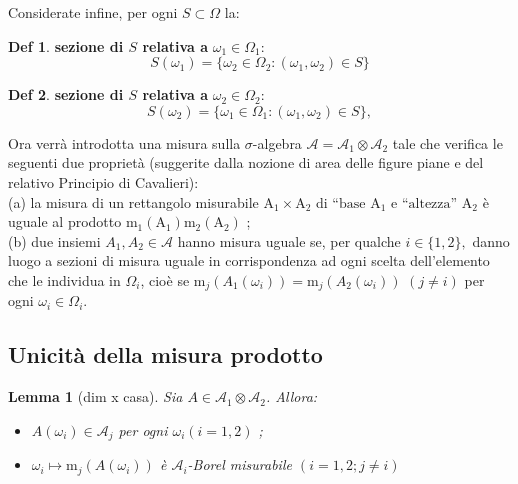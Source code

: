 \documentclass[a4paper,11pt]{article}
\theoremstyle{plain}
\newtheorem{lem}[thm]{Lemma}
\theoremstyle{definition}
\newtheorem{defn}{Def}[section]
\theoremstyle{remark}
\begin{document}
\noindent
Considerate infine, per ogni $S \subset \Omega$ la:

\begin{defn}
\textbf{sezione di $S$ relativa a} $\omega_{1}\in\Omega_{1}$:
$$
S(\omega_{1})=\{\omega_{2}\in\Omega_{2}:(\omega_{1}, \omega_{2})\in S\}
$$
\end{defn}
 
 \begin{defn}
\textbf{sezione di $S$ relativa a} $\omega_{2}\in\Omega_{2}$:
$$
S(\omega_{2})=\{\omega_{1}\in\Omega_{1}:(\omega_{1}, \omega_{2})\in S\},
$$
\end{defn}
 
 
 Ora verrà introdotta una misura sulla $\sigma$-algebra $\mathcal{A}=\mathcal{A}_{1}\otimes \mathcal{A}_{2}$ tale che verifica le seguenti due proprietà (suggerite dalla nozione di area delle figure piane $\mathrm{e}$ del relativo Principio di Cavalieri):\\
 
\noindent
(a) la misura di un rettangolo misurabile $\mathrm{A}_{1}\times \mathrm{A}_{2}$ di “$\mathrm{b}\mathrm{a}\mathrm{s}\mathrm{e}$ $\mathrm{A}_{1}$ e $ “\mathrm{a}\mathrm{l}\mathrm{t}\mathrm{e}\mathrm{z}\mathrm{z}\mathrm{a}$'' $\mathrm{A}_{2}$ è uguale al prodotto $\mathrm{m}_{1}(\mathrm{A}_{1})\mathrm{m}_{2}(\mathrm{A}_{2})$ ;\\

\noindent
(b) due insiemi $A_{1}, A_{2}\in \mathcal{A}$ hanno misura uguale se, per qualche $i\in\{1,2\},$ danno luogo a sezioni di misura uguale in corrispondenza ad ogni scelta dell'elemento che le individua in $\Omega_{i}$, cioè se $\mathrm{m}_{j}(A_{1}(\omega_{i}))=\mathrm{m}_{j}(A_{2}(\omega_{i}))$ $(j\neq i)$ per ogni $\omega_{i}\in\Omega_{i}.$

\subsection{Unicità della misura prodotto}
 \begin{lem}[dim x casa]  Sia $A\in \mathcal{A}_{1}\otimes \mathcal{A}_{2}$. Allora:
 \begin{itemize}
 \item $A(\omega_{i})\in \mathcal{A}_{j}$ per ogni $\omega_{i}(i=1,2)$ ;
 \item $\omega_{i}\mapsto \mathrm{m}_{j}(A(\omega_{i}))$ è $\mathcal{A}_{i}$-Borel misurabile $(i=1,2;j\neq i)$ 
 \end{itemize}
 \end{lem}
 
\end{document}
